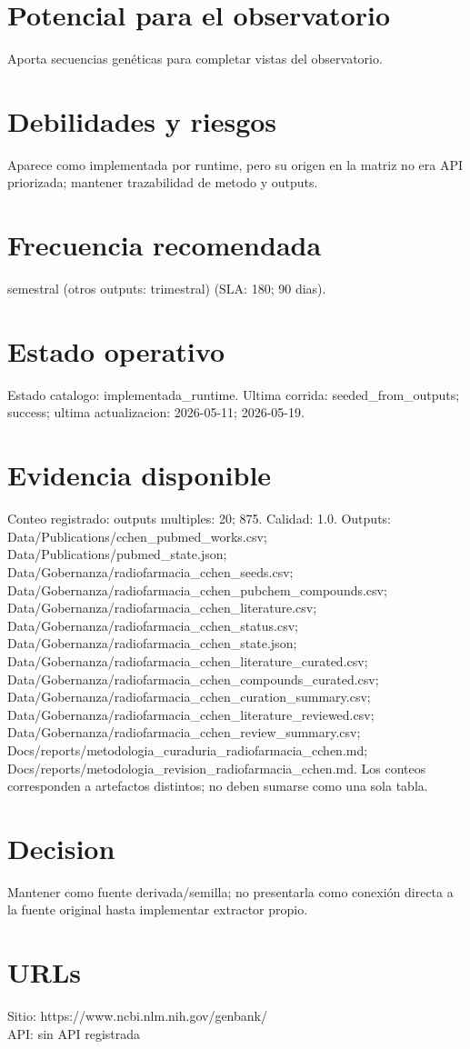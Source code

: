 \documentclass[10pt,a4paper]{article}
\begin{document}
\section*{Potencial para el observatorio}
Aporta secuencias genéticas para completar vistas del observatorio.

\section*{Debilidades y riesgos}
Aparece como implementada por runtime, pero su origen en la matriz no era API priorizada; mantener trazabilidad de metodo y outputs.

\section*{Frecuencia recomendada}
semestral (otros outputs: trimestral) (SLA: 180; 90 dias).

\section*{Estado operativo}
Estado catalogo: implementada\_runtime. Ultima corrida: seeded\_from\_outputs; success; ultima actualizacion: 2026-05-11; 2026-05-19.

\section*{Evidencia disponible}
Conteo registrado: outputs multiples: 20; 875. Calidad: 1.0. Outputs: Data/Publications/cchen\_pubmed\_works.csv; Data/Publications/pubmed\_state.json; Data/Gobernanza/radiofarmacia\_cchen\_seeds.csv; Data/Gobernanza/radiofarmacia\_cchen\_pubchem\_compounds.csv; Data/Gobernanza/radiofarmacia\_cchen\_literature.csv; Data/Gobernanza/radiofarmacia\_cchen\_status.csv; Data/Gobernanza/radiofarmacia\_cchen\_state.json; Data/Gobernanza/radiofarmacia\_cchen\_literature\_curated.csv; Data/Gobernanza/radiofarmacia\_cchen\_compounds\_curated.csv; Data/Gobernanza/radiofarmacia\_cchen\_curation\_summary.csv; Data/Gobernanza/radiofarmacia\_cchen\_literature\_reviewed.csv; Data/Gobernanza/radiofarmacia\_cchen\_review\_summary.csv; Docs/reports/metodologia\_curaduria\_radiofarmacia\_cchen.md; Docs/reports/metodologia\_revision\_radiofarmacia\_cchen.md. Los conteos corresponden a artefactos distintos; no deben sumarse como una sola tabla.

\section*{Decision}
Mantener como fuente derivada/semilla; no presentarla como conexión directa a la fuente original hasta implementar extractor propio.


\section*{URLs}
Sitio: https://www.ncbi.nlm.nih.gov/genbank/\\
API: sin API registrada
\end{document}
